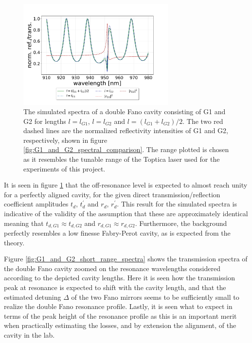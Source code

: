 \begin{figure}[h!]
    \centering
    \includegraphics[width=0.7\textwidth]{figures/results/M3:M5/M3:M5_sim_spectra_long.pdf}
    \caption{The simulated spectra of a double Fano cavity consisting of G1 and G2 for lengths $l=l_{G1}$, $l=l_{G2}$ and $l = (l_{G1}+l_{G2})/2$. The two red dashed lines are the normalized reflectivity intensities of G1 and G2, respectively, shown in figure \ref{fig:G1_and_G2_spectral_comparison}. The range plotted is chosen as it resembles the tunable range of the Toptica laser used for the experiments of this project.}
    \label{fig:G1_and_G2_full_range_spectra}
\end{figure}

It is seen in figure \ref{fig:G1_and_G2_full_range_spectra} that the off-resonance level is expected to almost reach unity for a perfectly aligned cavity, for the given direct transmission/reflection coefficient amplitudes $t_d$, $t_d^{\prime}$ and $r_d$, $r_d^{\prime}$. This result for the simulated spectra is indicative of the validity of the assumption that these are approximately identical meaning that $t_{d,G1} \approx t_{d,G2}$ and $r_{d,G1} \approx r_{d,G2}$. Furthermore, the background perfectly resembles a low finesse Fabry-Perot cavity, as is expected from the theory. 

Figure \ref{fig:G1_and_G2_short_range_spectra} shows the transmission spectra of the double Fano cavity zoomed on the resonance wavelengths considered according to the depicted cavity lengths. Here it is seen how the transmission peak at resonance is expected to shift with the cavity length, and that the estimated detuning $\Delta$ of the two Fano mirrors seems to be sufficiently small to realize the double Fano resonance profile. Lastly, it is seen what to expect in terms of the peak height of the resonance profile as this is an important merit when practically estimating the losses, and by extension the alignment, of the cavity in the lab. 

